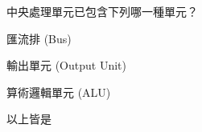 \ifx\ntpcNinetyTwo\undefined[92學年基北區] \fi
中央處理單元已包含下列哪一種單元？
  \begin{optionlist}
  \item 匯流排 (Bus)
  \item 輸出單元 (Output Unit)
  \item 算術邏輯單元 (ALU)	\label{ntpc-92-a9}
  \item 以上皆是
  \end{optionlist}